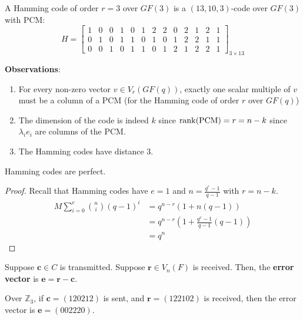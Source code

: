 \begin{exbox}
    \begin{example}
        A Hamming code of order $ r=3 $ over $ GF(3) $ is a $ (13,10,3) $-code over $ GF(3) $ with
        PCM\@:
        \[ H=
            \left[\begin{array}{ccc|ccc|ccc|ccc|c}
                    1 & 0 & 0 & 1 & 0 & 1 & 2 & 2 & 0 & 2 & 1 & 2 & 1 \\
                    0 & 1 & 0 & 1 & 1 & 0 & 1 & 0 & 1 & 2 & 2 & 1 & 1 \\
                    0 & 0 & 1 & 0 & 1 & 1 & 0 & 1 & 2 & 1 & 2 & 2 & 1
                \end{array}\right]_{3\times{} 13} \]
    \end{example}
\end{exbox}

\textbf{Observations}:
\begin{enumerate}[label=(\roman*)]
    \item For every non-zero vector $ v\in V_r(GF(q)) $, exactly one scalar multiple of $ v $
          must be a column of a PCM (for the Hamming code of order $ r $ over $ GF(q) $)
    \item The dimension of the code is indeed $ k $ since $ \operatorname{rank}(\text{PCM})=r=n-k $
          since $ \lambda_i e_i $ are columns of the PCM\@.
    \item The Hamming codes have distance 3.
\end{enumerate}

\begin{thmbox}
    \begin{theorem}
        Hamming codes are perfect.
    \end{theorem}
\end{thmbox}
\begin{proof}
    Recall that Hamming codes have $ e=1 $ and $ n=\frac{q^r-1}{q-1} $ with $ r=n-k $.
    \begin{align*}
        M \sum\limits_{i=0}^{e} \binom{n}{i}(q-1)^i
         & =q^{n-r}(1+n(q-1))                               \\
         & =q^{n-r}\left( 1+\frac{q^r-1}{q-1} (q-1) \right) \\
         & =q^n
    \end{align*}
\end{proof}

\begin{defbox}
    \begin{definition}
        Suppose $ \bm{c}\in C $ is transmitted. Suppose $ \bm{r}\in V_n(F) $ is received.
        Then, the \textbf{error vector} is $ \bm{e}=\bm{r}-\bm{c} $.
    \end{definition}
\end{defbox}

\begin{exbox}
    \begin{example}
        Over $ \mathbb{Z}_3 $, if $ \bm{c}=(120212) $ is sent, and $ \bm{r}=(122102) $ is received, then
        the error vector is $ \bm{e}=(002220) $.
    \end{example}
\end{exbox}
